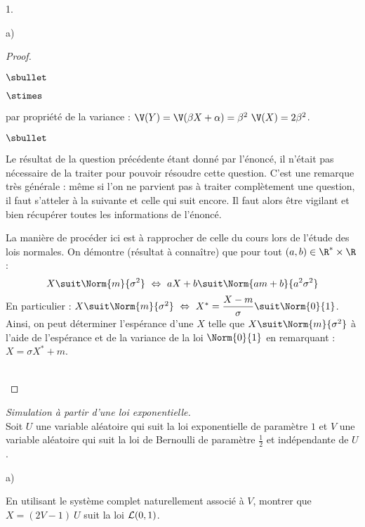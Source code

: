 \begin{noliste}{1.}
\begin{noliste}{a)}
\begin{proof}
\begin{noliste}{$\sbullet$}
\begin{noliste}{$\stimes$}
        \item par propriété de la variance : $\V(Y) = \V(\beta X +
          \alpha) = \beta^2 \ \V(X) = 2 \beta^2$.
        \end{noliste}
      \end{noliste}
      \begin{remark}%
        \begin{noliste}{$\sbullet$}
        \item Le résultat de la question précédente étant donné par
          l'énoncé, il n'était pas nécessaire de la traiter pour
          pouvoir résoudre cette question. C'est une remarque très
          générale : même si l'on ne parvient pas à traiter
          complètement une question, il faut s'atteler à la suivante
          et celle qui suit encore. Il faut alors être vigilant et
          bien récupérer toutes les informations de l'énoncé.
        \item La manière de procéder ici est à rapprocher de celle du
          cours lors de l'étude des lois normales. On démontre
          (résultat à connaître) que pour tout $(a, b) \in \R^* \times
          \R$ :
          \[
          X \suit \Norm{m}{\sigma^2} \ \Leftrightarrow \ a X + b \suit
          \Norm{am + b}{a^2\sigma^2}
          \]
          En particulier : $X \suit \Norm{m}{\sigma^2} \
          \Leftrightarrow \ X^* = \dfrac{X - m}{\sigma} \suit
          \Norm{0}{1}$.\\
          Ainsi, on peut déterminer l'espérance d'une \var $X$ telle
          que $X \suit \Norm{m}{\sigma^2}$ à l'aide de l'espérance et
          de la variance de la loi $\Norm{0}{1}$ en remarquant : \\
          $X =
          \sigma X^* + m$.
        \end{noliste}
      \end{remark}~\\[-1.2cm]
    \end{proof}
  \end{noliste}

\item {\em Simulation à partir d'une loi exponentielle.}\\
  Soit $U$ une variable aléatoire qui suit la loi exponentielle de
  paramètre $1$ et $V$ une variable aléatoire qui suit la loi de
  Bernoulli de paramètre $\frac{1}{2}$ et indépendante de $U$.
  \begin{noliste}{a)}
    \setlength{\itemsep}{2mm} %
  \item En utilisant le système complet naturellement associé à $V$,
    montrer que $X = (2V-1) \ U$ suit la loi ${\cal L}(0,1)$.


\end{noliste}
\end{noliste}

